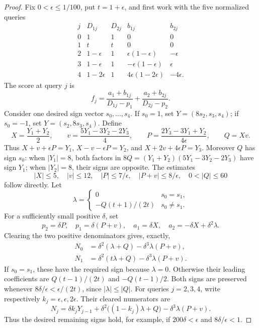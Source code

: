 \documentclass[11pt]{article}
\begin{document}
\begin{proof}
Fix $0<\epsilon\le 1/100$, put $t=1+\epsilon$, and first work with
the five normalized queries
\[
\begin{array}{c|cc|cc}
j&D_{1j}&D_{2j}&b_{1j}&b_{2j}\\ \hline
0&1&1&0&0\\
1&t&t&0&0\\
2&1-\epsilon&1&\epsilon(1-\epsilon)&-\epsilon\\
3&1-\epsilon&1&-\epsilon(1-\epsilon)&\epsilon\\
4&1-2\epsilon&1&4\epsilon(1-2\epsilon)&-4\epsilon.
\end{array}
\]
The score at query $j$ is
\[
 f_j=\frac{a_1+b_{1j}}{D_{1j}-p_1}
       +\frac{a_2+b_{2j}}{D_{2j}-p_2}.
\]
Consider one desired sign vector $s_0,\ldots,s_4$. If $s_0=1$, set
$Y=(8s_2,s_3,s_4)$; if $s_0=-1$, set $Y=(s_2,8s_3,s_4)$.
Define
\[
 X=\frac{Y_1+Y_2}{2},\qquad
 v=\frac{5Y_1-3Y_2-2Y_3}{4},\qquad
 P=\frac{2Y_3-3Y_1+Y_2}{4\epsilon},\qquad Q=Xv.
\]
Thus $X+v+\epsilon P=Y_1$,
$X-v-\epsilon P=Y_2$, and $X+2v+4\epsilon P=Y_3$.
Moreover $Q$ has sign $s_0$: when $|Y_1|=8$, both factors
in $8Q=(Y_1+Y_2)(5Y_1-3Y_2-2Y_3)$ have sign $Y_1$;
when $|Y_2|=8$, their signs are opposite. The estimates
\[
 |X|\le5,\quad |v|\le12,\quad |P|\le7/\epsilon,
 \quad |P+v|\le8/\epsilon,\quad 0<|Q|\le60
\]
follow directly. Let
\[
 \lambda=\begin{cases}0&s_0=s_1,\\
 -Q(t+1)/(2t)&s_0\ne s_1.
 \end{cases}
\]
For a sufficiently small positive $\delta$, set
\[
 p_2=\delta P,\quad p_1=\delta(P+v),\quad
 a_1=\delta X,\quad a_2=-\delta X+\delta^2\lambda.
\]
Clearing the two positive denominators gives, exactly,
\[
\begin{split}
 N_0&=\delta^2(\lambda+Q)-\delta^3\lambda(P+v),\\
 N_1&=\delta^2(t\lambda+Q)-\delta^3\lambda(P+v).
\end{split}
\]
If $s_0=s_1$, these have the required sign because $\lambda=0$.
Otherwise their leading coefficients are
$Q(t-1)/(2t)$ and $-Q(t-1)/2$. Both signs are preserved whenever
$8\delta/\epsilon<\epsilon/(2t)$, since $|\lambda|\le|Q|$.
For queries $j=2,3,4$, write respectively
$k_j=\epsilon,\epsilon,2\epsilon$. Their cleared numerators are
\[
 N_j=\delta k_jY_{j-1}
   +\delta^2\bigl((1-k_j)\lambda+Q\bigr)
   -\delta^3\lambda(P+v).
\]
Thus the desired remaining signs hold, for example, if
$200\delta<\epsilon$ and $8\delta/\epsilon<1$.


\end{proof}
\end{document}
